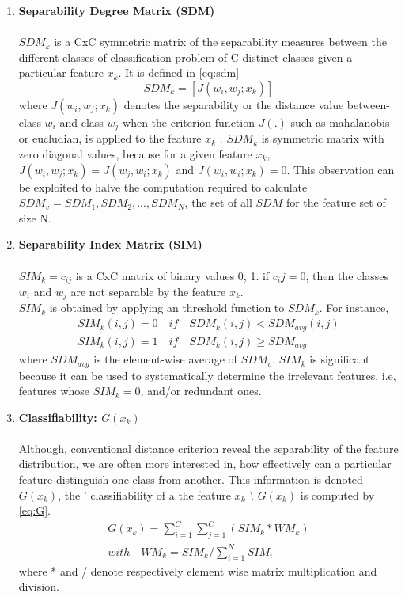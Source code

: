 \begin{enumerate}
	\item \textbf{Separability Degree Matrix (SDM)}\\\\
	\(SDM_k\) is a CxC symmetric matrix of the separability measures between the different classes of classification problem of C distinct classes given a particular feature \(x_k\).
	It is defined in \ref{eq:sdm}
\subitem \[SDM_k = [J(w_i, w_j; {x_k})] \label{eq:sdm}\]	
\subitem where \(J(w_i, w_j; {x_k})\) denotes the separability or the distance value between-class \(w_i\)  and class \(w_j\) when the criterion function \(J(\textbf{.})\) such as mahalanobis \cite{maha2013} or eucludian, is applied to the feature \(x_k\) \cite{sima2013}. 
	\(SDM_k\) is symmetric matrix with zero diagonal values, because for a given feature \(x_k\), \(J(w_i, w_j; {x_k}) = J(w_j, w_i; {x_k})\) and \(J(w_i, w_i; {x_k}) = 0\).
	This observation can be exploited to halve the computation required to calculate \(SDM_v = {SDM_1, SDM_2, ..., SDM_N}\), the set of all \(SDM\) for the feature set of size N.
	 
	\item \textbf{Separability Index Matrix (SIM)}\\\\
	\(SIM_k = {c_{ij}}\) is a CxC matrix of binary values {0, 1}. if \(c_ij=0\), then the classes \(w_i\) and \(w_j\) are not separable by the feature \(x_k\).\\
	\(SIM_k\) is obtained by applying an threshold function to \(SDM_k\).
	For instance, 
	\begin{align*}
		SIM_k(i, j) = 0 \quad if  \quad SDM_k(i, j) < SDM_{avg}(i, j)\\
		SIM_k(i,j) = 1 \quad if  \quad SDM_k(i,j) \geq SDM_{avg}
	\end{align*}
	where \(SDM_{avg}\) is the element-wise average of \(SDM_v\).
	\(SIM_k\) is significant because it can be used to systematically determine the irrelevant features, i.e, features whose \(SIM_k = 0\), and/or redundant ones. \cite{sima2013}
	
	
	\item \textbf{Classifiability: \(G(x_k)\)} \label{con:class}\\\\
	Although, conventional distance criterion reveal the separability of the feature distribution, \cite{sima2013}
	 we are often more interested in, how effectively can a particular feature distinguish one class from another. This information is denoted \(G(x_k)\), the ' classifiability of a the feature \(x_k\) '.
	 \(G(x_k)\) is computed by \ref{eq:G}.
	 \begin{align}
	 	G(x_k) = \sum_{i = 1}^{C}\sum_{j = 1}^{C}(SIM_k*WM_k) \label{eq:G}
	 	\\ with \quad WM_k = SIM_k / \sum_{i=1}^{N}SIM_i
	 \end{align}
	 where * and / denote respectively element wise matrix multiplication and division.
\end{enumerate}

